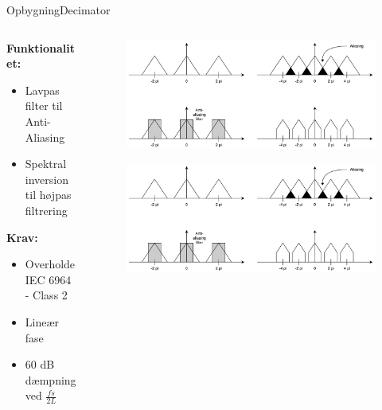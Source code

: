 \begin{frame}{Opbygning}{Decimator}	
	\begin{columns}
		\begin{column}{0.4\textwidth}
			\textbf{Funktionalitet:}
			\begin{itemize}
				\item Lavpas filter til Anti-Aliasing
				\item Spektral inversion til højpas filtrering 
			\end{itemize}
			
			\textbf{Krav:}
			\begin{itemize}
				\item Overholde IEC 6964 - Class 2
				\item Lineær fase
				\item 60 dB dæmpning ved $\frac{fs}{2L}$
			\end{itemize}
		\end{column}
		\begin{column}{0.3\textwidth}
			\begin{figure}
				\centering
				\includegraphics[width=\textwidth]{aliasing1}
			\end{figure}
			\begin{figure}
				\centering
				\includegraphics[width=\textwidth]{aliasing3}

\end{figure}
\end{column}
\end{columns}
\end{frame}
